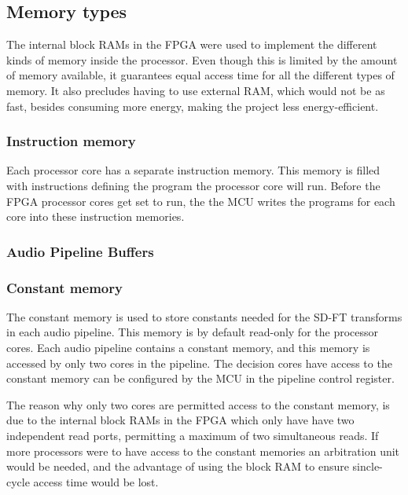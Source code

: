 \subsection{Memory types}\label{subsec:fpga-memory}

The internal block RAMs in the FPGA were used to implement the different kinds
of memory inside the processor. Even though this is limited by the amount of
memory available, it guarantees equal access time for all the different types
of memory. It also precludes having to use external RAM, which would not be as
fast, besides consuming more energy, making the project less energy-efficient.

\subsubsection{Instruction memory}

Each processor core has a separate instruction memory. This memory is filled
with instructions defining the program the processor core will run. Before the
FPGA processor cores get set to run, the the MCU writes the programs for each
core into these instruction memories.

\subsubsection{Audio Pipeline Buffers}

\subsubsection{Constant memory}

The constant memory is used to store constants needed for the SD-FT transforms in each audio pipeline. This memory is by default
read-only for the processor cores. Each audio pipeline contains a constant
memory, and this memory is accessed by only two cores in the pipeline. The
decision cores have access to the constant memory can be configured by the MCU
in the pipeline control register.

The reason why only two cores are permitted access to the constant memory, is
due to the internal block RAMs in the FPGA which only have have two independent
read ports, permitting a maximum of two simultaneous reads. If more processors
were to have access to the constant memories an arbitration unit would be
needed, and the advantage of using the block RAM to ensure sincle-cycle access
time would be lost.
